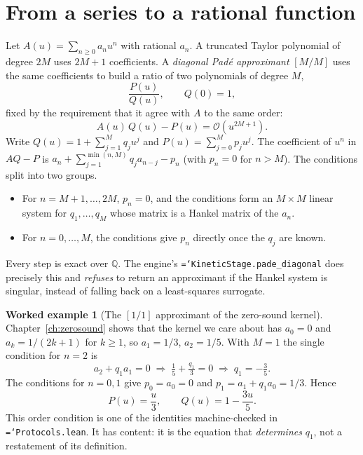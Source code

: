\documentclass[11pt,a4paper,openany]{book}
\newcommand{\code}[1]{\texttt{\hyphenchar\font=`\-\relax #1}}
\newcommand{\Q}{\mathbb{Q}}
\theoremstyle{definition}
\newtheorem{example}{Worked example}[chapter]
\theoremstyle{plain}
\begin{document}
\section{From a series to a rational function}

Let $A(u)=\sum_{n\ge0}a_nu^n$ with rational $a_n$. A truncated Taylor polynomial of degree $2M$
uses $2M+1$ coefficients. A \emph{diagonal Padé approximant} $[M/M]$ uses the same coefficients to
build a ratio of two polynomials of degree $M$,
\begin{equation}
  \frac{P(u)}{Q(u)}, \qquad Q(0)=1,
\end{equation}
fixed by the requirement that it agree with $A$ to the same order:
\begin{equation}
  A(u)\,Q(u) - P(u) = \mathcal{O}\!\left(u^{2M+1}\right).
  \label{eq:padeorder}
\end{equation}
Write $Q(u)=1+\sum_{j=1}^M q_ju^j$ and $P(u)=\sum_{j=0}^M p_ju^j$. The coefficient of $u^n$ in
$AQ-P$ is $a_n+\sum_{j=1}^{\min(n,M)}q_ja_{n-j}-p_n$ (with $p_n=0$ for $n>M$). The conditions
split into two groups.
\begin{itemize}
  \item For $n=M+1,\dots,2M$, $p_n=0$, and the conditions form an $M\times M$ linear system for
        $q_1,\dots,q_M$ whose matrix is a Hankel matrix of the $a_n$.
  \item For $n=0,\dots,M$, the conditions give $p_n$ directly once the $q_j$ are known.
\end{itemize}
Every step is exact over $\Q$. The engine's \code{KineticStage.pade\_diagonal} does precisely this
and \emph{refuses} to return an approximant if the Hankel system is singular, instead of falling
back on a least-squares surrogate.

\begin{example}[{The $[1/1]$ approximant of the zero-sound kernel}]
\label{ex:pade11}
Chapter~\ref{ch:zerosound} shows that the kernel we care about has $a_0=0$ and
$a_k=1/(2k+1)$ for $k\ge1$, so $a_1=1/3$, $a_2=1/5$. With $M=1$ the single condition for $n=2$ is
\[
  a_2+q_1a_1=0 \;\Longrightarrow\; \tfrac15+\tfrac{q_1}{3}=0 \;\Longrightarrow\; q_1=-\tfrac35 .
\]
The conditions for $n=0,1$ give $p_0=a_0=0$ and $p_1=a_1+q_1a_0=1/3$. Hence
\begin{equation}
  P(u)=\frac u3,\qquad Q(u)=1-\frac{3u}{5}.
  \label{eq:pade11}
\end{equation}
This order condition is one of the identities machine-checked in \code{Protocols.lean}. It has
content: it is the equation that \emph{determines} $q_1$, not a restatement of its definition.
\end{example}
\end{document}
